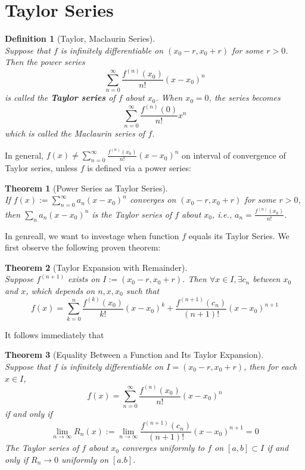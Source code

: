 \documentclass[12pt]{article}
\newtheorem{definition}{Definition}[section]
\newtheorem{theorem}{Theorem}[section]
\theoremstyle{definition}
\begin{document}
\section{Taylor Series}
\begin{definition}[Taylor, Maclaurin Series]
\hfill\\\normalfont Suppose that $f$ is infinitely differentiable on $(x_0-r,x_0+r)$ for some $r>0$. Then the power series 
\[
\sum_{n=0}^\infty \frac{f^{(n)}(x_0)}{n!}(x-x_0)^n
\]
is called the \textbf{Taylor series} of $f$ about $x_0$. When $x_0=0$, the series becomes 
\[
\sum_{n=0}^\infty \frac{f^{(n)}(0)}{n!}x^n
\]
which is called the Maclaurin series of $f$.
\end{definition}
In general, $f(x)\neq\sum_{n=0}^\infty \frac{f^{(n)}(x_0)}{n!}(x-x_0)^n$ on interval of convergence of Taylor series, unless $f$ is defined via a power series:
\begin{theorem}[Power Series as Taylor Series]
\hfill\\\normalfont If $f(x):=\sum_{n=0}^\infty a_n(x-x_0)^n$ converges on $(x_0-r,x_0+r)$ for some $r>0$, then $\sum_{n}a_n(x-x_0)^n$ is the Taylor series of $f$ about $x_0$, i.e., $a_n=\frac{f^{(n)}(x_0)}{n!}$.
\end{theorem}
In genreall, we want to investage when function $f$ equals its Taylor Series. We first observe the following proven theorem:
\begin{theorem}[Taylor Expansion with Remainder]
\hfill\\\normalfont Suppose $f^{(n+1)}$ exists on $I:=(x_0-r,x_0+r)$. Then $\forall x\in I, \exists c_n$ between $x_0$ and $x$, which depends on $n,x,x_0$ such that
\[
f(x)=\sum_{k=0}^n \frac{f^{(k)}(x_0)}{k!}(x-x_0)^k +\frac{f^{(n+1)}(c_n)}{(n+1)!}(x-x_0)^{n+1}
\]
\end{theorem}
It follows immediately that
\begin{theorem}[Equality Between a Function and Its Taylor Expansion]
\hfill\\\normalfont Suppose that $f$ is \textit{infinitely differentiable} on $I=(x_0-r,x_0+r)$, then for each $x\in I$,
\[
f(x)=\sum_{n=0}^\infty \frac{f^{(n)}(x_0)}{n!}(x-x_0)^n
\]
if and only if
\[
\lim_{n\to \infty}R_n(x):=\lim_{n\to\infty}\frac{f^{(n+1)}(c_n)}{(n+1)!}(x-x_0)^{n+1}=0
\]
The Taylor series of $f$ about $x_0$ converges uniformly to $f$ on $[a,b]\subset I$ if and only if $R_n\to 0$ uniformly on $[a.b]$.
\end{theorem}
\clearpage
\end{document}

